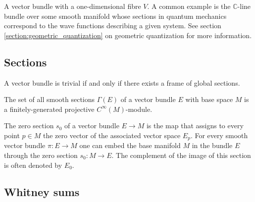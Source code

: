     \begin{example}
        A vector bundle with a one-dimensional fibre $V$. A common example is the $\mathbb{C}$-line bundle over some smooth manifold whose sections in quantum mechanics correspond to the wave functions describing a given system. See section \ref{section:geometric_quantization} on geometric quantization for more information.
    \end{example}

\subsection{Sections}

    \begin{property}\label{diff:trivial_vector_bundle}
        A vector bundle is trivial if and only if there exists a frame of global sections.
    \end{property}

    \begin{theorem}\label{diff:serre_swan}
        The set of all smooth sections $\Gamma(E)$ of a vector bundle $E$ with base space $M$ is a finitely-generated projective $C^\infty(M)$-module.
    \end{theorem}

    \begin{property}\label{diff:zero_section}
        The zero section $s_0$ of a vector bundle $E\rightarrow M$ is the map that assigns to every point $p\in M$ the zero vector of the associated vector space $E_p$. For every smooth vector bundle $\pi:E\rightarrow M$ one can embed the base manifold $M$ in the bundle $E$ through the zero section $s_0:M\rightarrow E$. The complement of the image of this section is often denoted by $E_0$.
    \end{property}

\subsection{Whitney sums}


